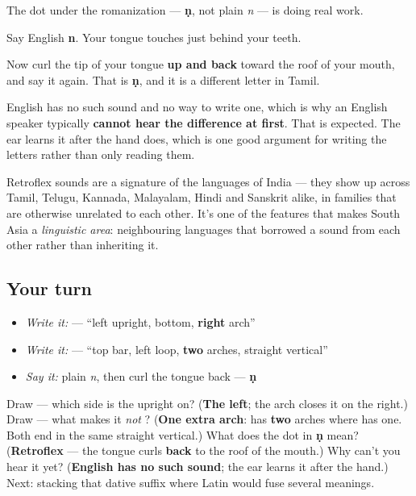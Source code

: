 The dot under the romanization — \textbf{ṇ}, not plain \emph{n} — is doing real work.

\begin{sounds}
Say English \textbf{n}. Your tongue touches just behind your teeth.

Now curl the tip of your tongue \textbf{up and back} toward the roof of your mouth, and say it again. That is \textbf{ṇ}, and it is a different letter in Tamil.

English has no such sound and no way to write one, which is why an English speaker typically \textbf{cannot hear the difference at first}. That is expected. The ear learns it after the hand does, which is one good argument for writing the letters rather than only reading them.

Retroflex sounds are a signature of the languages of India — they show up across Tamil, Telugu, Kannada, Malayalam, Hindi and Sanskrit alike, in families that are otherwise unrelated to each other. It's one of the features that makes South Asia a \emph{linguistic area}: neighbouring languages that borrowed a sound from each other rather than inheriting it.
\end{sounds}

\subsection*{Your turn}
\begin{itemize}
\raggedright
  \item \emph{Write it:}  — \textquotedblleft{}left upright, bottom, \textbf{right} arch\textquotedblright{}
  \item \emph{Write it:}  — \textquotedblleft{}top bar, left loop, \textbf{two} arches, straight vertical\textquotedblright{}
  \item \emph{Say it:} plain \emph{n}, then curl the tongue back — \textbf{ṇ}
\end{itemize}

\begin{tcolorbox}[breakable,colback=teal!4,colframe=teal!35!black,title={Before you move on}]
Draw \textbf{} — which side is the upright on? (\textbf{The left}; the arch closes it on the right.) Draw \textbf{} — what makes it \emph{not} ? (\textbf{One extra arch}:  has \textbf{two} arches where  has one. Both end in the same straight vertical.) What does the dot in \textbf{ṇ} mean? (\textbf{Retroflex} — the tongue curls \textbf{back} to the roof of the mouth.) Why can't you hear it yet? (\textbf{English has no such sound}; the ear learns it after the hand.) Next: stacking that dative suffix where Latin would fuse several meanings.
\end{tcolorbox}
